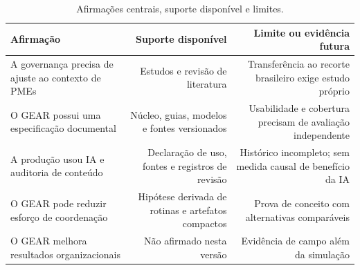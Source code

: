 \begin{table}[htbp]
  \centering
  \caption{Afirmações centrais, suporte disponível e limites.}
  \label{tab:claim-evidence}
  \small
  \begin{tabularx}{\textwidth}{@{}L{3.0cm}R R@{}}
    \toprule
    Afirmação & Suporte disponível & Limite ou evidência futura \\
    \midrule
    A governança precisa de ajuste ao contexto de PMEs & Estudos e revisão de literatura & Transferência ao recorte brasileiro exige estudo próprio \\
    O GEAR possui uma especificação documental & Núcleo, guias, modelos e fontes versionados & Usabilidade e cobertura precisam de avaliação independente \\
    A produção usou IA e auditoria de conteúdo & Declaração de uso, fontes e registros de revisão & Histórico incompleto; sem medida causal de benefício da IA \\
    O GEAR pode reduzir esforço de coordenação & Hipótese derivada de rotinas e artefatos compactos & Prova de conceito com alternativas comparáveis \\
    O GEAR melhora resultados organizacionais & Não afirmado nesta versão & Evidência de campo além da simulação \\
    \bottomrule
  \end{tabularx}
\end{table}
